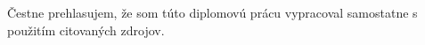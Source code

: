 \thispagestyle{empty}
\vspace*{\fill}
\hfill
\begin{minipage}{0.63\textwidth}
Čestne prehlasujem, že som túto diplomovú prácu vypracoval samostatne s použitím citovaných zdrojov.

\bigskip
	\begin{flushright}
	\begin{minipage}{0.5\textwidth}
	\dotfill
	\end{minipage}
	\end{flushright}
\end{minipage}